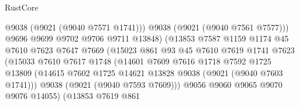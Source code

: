 \begin{lexlean}{RustCore}
\begin{coremodule}
                                        @9038
                                        (@9021 (@9040 @7571 @1741)))
                                      @9038
                                      (@9021 (@9040 @7561 @7577)))
                                    @9696
                                    @9699
                                    @9702
                                    @9706
                                    @9711
                                    @13848)
                                  (@13853
                                    @7587
                                    @1159
                                    @1174
                                    @45
                                    @7610
                                    @7623
                                    @7647
                                    @7669
                                    (@15023
                                      @861
                                      @93
                                      @45
                                      @7610
                                      @7619
                                      @1741
                                      @7623
                                      (@15033
                                        @7610
                                        @7617
                                        @1748
                                        (@14601
                                          @7609
                                          @7616
                                          @1718
                                          @7592
                                          @1725
                                          @13809
                                          (@14615
                                            @7602
                                            @1725
                                            @14621
                                            @13828
                                            @9038
                                            (@9021 (@9040 @7603 @1741)))
                                          @9038
                                          (@9021 (@9040 @7593 @7609)))
                                        @9056
                                        @9060
                                        @9065
                                        @9070
                                        @9076
                                        @14055)
                                      (@13853
                                        @7619
                                        @861

\end{coremodule}
\end{lexlean}
